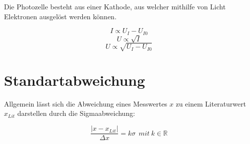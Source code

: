 Die Photozelle besteht aus einer Kathode, aus welcher mithilfe von Licht Elektronen ausgelöst werden können.


\begin{equation}
    I \propto U_I - U_{I0}
\end{equation}
\begin{equation}
    U \propto \sqrt{I} 
\end{equation}
\begin{equation}
    U \propto \sqrt{U_I - U_{I0}} 
\end{equation}

\section{Standartabweichung}
Allgemein lässt sich die Abweichung eines Messwertes $x$ zu einem Literaturwert $x_{Lit}$ darstellen durch die Sigmaabweichung:

\begin{equation}
    \frac{|x-x_{Lit}|}{\Delta x} = k \sigma \ \ mit \ k \in \mathbb{R}
    \label{eq:sigma}
\end{equation}
